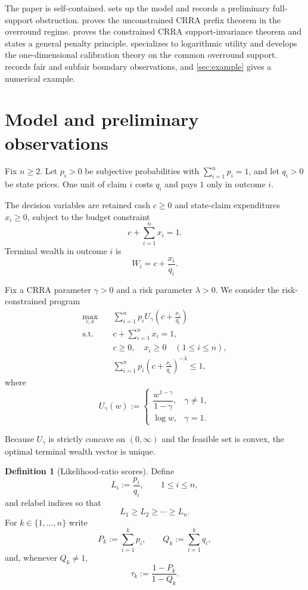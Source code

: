 \documentclass[11pt]{article}
\theoremstyle{definition}
\newtheorem{definition}[theorem]{Definition}
\theoremstyle{remark}
\newcommand{\1}{\mathbf{1}}
\begin{document}
The paper is self-contained.  sets up the model and records a preliminary full-support obstruction.  proves the unconstrained CRRA prefix theorem in the overround regime.  proves the constrained CRRA support-invariance theorem and states a general penalty principle.  specializes to logarithmic utility and develops the one-dimensional calibration theory on the common overround support.  records fair and subfair boundary observations, and \cref{sec:example} gives a numerical example.

\section{Model and preliminary observations}
\label{sec:model}

Fix $n\ge 2$. Let $p_i>0$ be subjective probabilities with $\sum_{i=1}^n p_i=1$, and let $q_i>0$ be state prices. One unit of claim $i$ costs $q_i$ and pays $1$ only in outcome $i$.

The decision variables are retained cash $c\ge 0$ and state-claim expenditures $x_i\ge 0$, subject to the budget constraint
\[
c+\sum_{i=1}^n x_i=1.
\]
Terminal wealth in outcome $i$ is
\[
W_i=c+\frac{x_i}{q_i}.
\]

Fix a CRRA parameter $\gamma>0$ and a risk parameter $\lambda>0$. We consider the risk-constrained program
\begin{equation}
\label{eq:primal}
\begin{aligned}
\max_{c,x}\quad & \sum_{i=1}^n p_i U_\gamma\!\left(c+\frac{x_i}{q_i}\right) \\
\text{s.t.}\quad & c+\sum_{i=1}^n x_i=1, \\
& c\ge 0,\quad x_i\ge 0\quad (1\le i\le n), \\
& \sum_{i=1}^n p_i\left(c+\frac{x_i}{q_i}\right)^{-\lambda}\le 1,
\end{aligned}
\end{equation}
where
\[
U_\gamma(w):=
\begin{cases}
\dfrac{w^{1-\gamma}}{1-\gamma}, & \gamma\neq 1,\\[6pt]
\log w, & \gamma=1.
\end{cases}
\]

Because $U_\gamma$ is strictly concave on $(0,\infty)$ and the feasible set is convex, the optimal terminal wealth vector is unique.

\begin{definition}[Likelihood-ratio scores]
Define
\[
L_i:=\frac{p_i}{q_i},\qquad 1\le i\le n,
\]
and relabel indices so that
\[
L_1\ge L_2\ge \cdots \ge L_n.
\]
For $k\in\{1,\dots,n\}$ write
\[
P_k:=\sum_{i=1}^k p_i,
\qquad
Q_k:=\sum_{i=1}^k q_i,
\]
and, whenever $Q_k\neq 1$,
\[
\tau_k:=\frac{1-P_k}{1-Q_k}.
\]
\end{definition}
\end{document}
